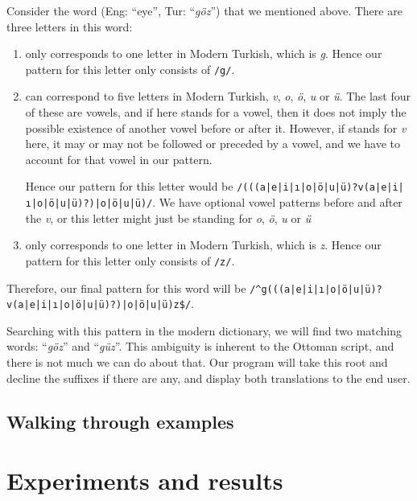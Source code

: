 \documentclass[10pt,twocolumn]{article}
\theoremstyle{nonumberplain}
\newcommand{\otto}[1]{\RLE{\ottoman{}\Large{}#1}}
\newcommand{\word}[1]{``\emph{#1}''}
\newcommand{\TODO}[1]{{\color{red}{[TODO: #1]}}}
\begin{document}
Consider the word \otto{گوز} (Eng: ``eye'', Tur: \word{göz}) that we mentioned above.
There are three letters in this word: %
\begin{enumerate}[noitemsep,topsep=0pt]
  \item \otto{گ} only corresponds to one letter in Modern Turkish, which is
    \emph{g}. Hence our pattern for this letter only consists of \texttt{/g/}.
  \item \otto{و} can correspond to five letters in Modern Turkish, \emph{v},
    \emph{o}, \emph{ö}, \emph{u} or \emph{ü}. The last four of these are
    vowels, and if \otto{و} here stands for a vowel, then it does not imply the
    possible existence of another vowel before or after it. However, if
    \otto{و} stands for \emph{v} here, it may or may not be followed or
    preceded by a vowel, and we have to account for that vowel in our pattern.

    Hence our pattern for this letter would be
    \texttt{/(((a|e|i|ı|o|ö|u|ü)?v(a|e|i|ı|o|ö|u|ü)?)|o|ö|u|ü)/}.
    We have optional vowel patterns before and after the \emph{v}, or this
    letter might just be standing for \emph{o}, \emph{ö}, \emph{u} or \emph{ü}
\item \otto{ز} only corresponds to one letter in Modern Turkish, which is
    \emph{z}. Hence our pattern for this letter only consists of \texttt{/z/}.
\end{enumerate}

Therefore, our final pattern for this word will be
\texttt{/\^{}g(((a|e|i|ı|o|ö|u|ü)?v(a|e|i|ı|o|ö|u|ü)?)|o|ö|u|ü)z\$/}.

Searching with this pattern in the modern dictionary, we will find two matching
words: \word{göz} and \word{güz}. This ambiguity is inherent to the Ottoman
script, and there is not much we can do about that. Our program will take this
root and decline the suffixes if there are any, and display both translations
to the end user.

\subsection{Walking through examples}

\TODO{gotta write}

\section{Experiments and results}
\end{document}

